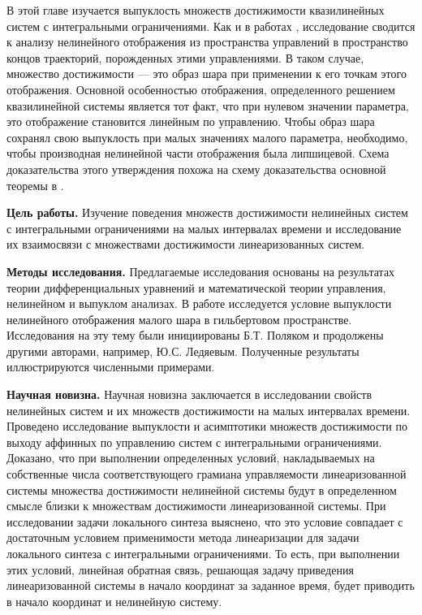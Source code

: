 \documentclass[../main.tex]{subfiles}
\begin{document}
В этой главе изучается выпуклость множеств достижимости квазилинейных систем с интегральными ограничениями. 
Как и в работах \cite{Polyak2001, Polyak2004, GusOsSteklov, GusevUMJ, Osipov, GusevOsipov},  исследование сводится к анализу нелинейного отображения из пространства управлений в пространство концов траекторий, порожденных этими управлениями.
В таком случае, множество достижимости --- это образ шара при применении к его точкам этого отображения. 
Основной особенностью отображения, определенного решением квазилинейной системы является тот факт, что при нулевом значении параметра, это отображение становится линейным по управлению.
Чтобы образ шара сохранял свою выпуклость при малых значениях малого параметра, необходимо, чтобы производная нелинейной части отображения была липшицевой. 
Схема доказательства этого утверждения похожа на схему доказательства основной теоремы в \cite{Polyak2001}.

\textbf{Цель работы.} Изучение поведения множеств достижимости нелинейных систем с интегральными ограничениями на малых интервалах времени и исследование их взаимосвязи с множествами достижимости линеаризованных систем.

\textbf{Методы исследования.} Предлагаемые исследования основаны на результатах теории дифференциальных уравнений и математической теории управления, нелинейном и выпуклом анализах. В работе исследуется условие выпуклости нелинейного отображения малого шара в гильбертовом пространстве. Исследования на эту тему были инициированы Б.Т. Поляком\cite{Polyak2001} и продолжены другими авторами, например, Ю.С. Ледяевым\cite{Ledyaev}. Полученные результаты иллюстрируются численными примерами.

\textbf{Научная новизна.} Научная новизна заключается в исследовании свойств нелинейных систем и их множеств достижимости на малых интервалах времени. Проведено исследование выпуклости и асимптотики множеств достижимости по выходу аффинных по управлению систем с интегральными ограничениями. Доказано, что при выполнении определенных условий, накладываемых на собственные числа соответствующего грамиана управляемости линеаризованной системы множества достижимости нелинейной системы будут в определенном смысле близки к множествам достижимости линеаризованной системы. При исследовании задачи локального синтеза выяснено, что это условие совпадает с достаточным условием применимости метода линеаризации для задачи локального синтеза с интегральными ограничениями. То есть, при выполнении этих условий, линейная обратная связь, решающая задачу приведения линеаризованной системы в начало координат за заданное время, будет приводить в начало координат и нелинейную систему.
\end{document}
